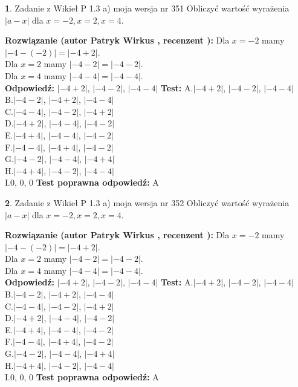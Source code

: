 \documentclass[12pt, a4paper]{article}
\theoremstyle{definition} %
\newtheorem{zad}{}
\newcommand{\zadStart}[1]{\begin{zad}#1\newline}
\newcommand{\zadStop}{\end{zad}}
\newcommand{\rozwStart}[2]{\noindent \textbf{Rozwiązanie (autor #1 , recenzent #2): }\newline}
\newcommand{\rozwStop}{\newline}
\newcommand{\odpStart}{\noindent \textbf{Odpowiedź:}\newline}
\newcommand{\odpStop}{\newline}
\newcommand{\testStart}{\noindent \textbf{Test:}\newline}
\newcommand{\testStop}{\newline}
\newcommand{\kluczStart}{\noindent \textbf{Test poprawna odpowiedź:}\newline}
\newcommand{\kluczStop}{\newline}
\begin{document}
\zadStart{Zadanie z Wikieł P 1.3 a) moja wersja nr 351}
Obliczyć wartość wyrażenia $|a - x|$ dla $x=-2,x=2,x=4$.
\zadStop
\rozwStart{Patryk Wirkus}{}
Dla $x = -2$ mamy $|-4 - (-2)| = |-4 + 2|$.\\
Dla $x = 2$ mamy $|-4 - 2| = |-4 - 2|$.\\
Dla $x = 4$ mamy $|-4 - 4| = |-4 - 4|$.\\
\rozwStop
\odpStart
$|-4 + 2|$, $|-4 - 2|$, $|-4 - 4|$
\odpStop
\testStart
A.$|-4 + 2|$, $|-4 - 2|$, $|-4 - 4|$\\
B.$|-4 - 2|$, $|-4 + 2|$, $|-4 - 4|$\\
C.$|-4 - 4|$, $|-4 - 2|$, $|-4 + 2|$\\
D.$|-4 + 2|$, $|-4 - 4|$, $|-4 - 2|$\\
E.$|-4 + 4|$, $|-4 - 4|$, $|-4 - 2|$\\
F.$|-4 - 4|$, $|-4 + 4|$, $|-4 - 2|$\\
G.$|-4 - 2|$, $|-4 - 4|$, $|-4 + 4|$\\
H.$|-4 + 4|$, $|-4 - 2|$, $|-4 - 4|$\\
I.$0$, $0$, $0$
\testStop
\kluczStart
A
\kluczStop



\zadStart{Zadanie z Wikieł P 1.3 a) moja wersja nr 352}
Obliczyć wartość wyrażenia $|a - x|$ dla $x=-2,x=2,x=4$.
\zadStop
\rozwStart{Patryk Wirkus}{}
Dla $x = -2$ mamy $|-4 - (-2)| = |-4 + 2|$.\\
Dla $x = 2$ mamy $|-4 - 2| = |-4 - 2|$.\\
Dla $x = 4$ mamy $|-4 - 4| = |-4 - 4|$.\\
\rozwStop
\odpStart
$|-4 + 2|$, $|-4 - 2|$, $|-4 - 4|$
\odpStop
\testStart
A.$|-4 + 2|$, $|-4 - 2|$, $|-4 - 4|$\\
B.$|-4 - 2|$, $|-4 + 2|$, $|-4 - 4|$\\
C.$|-4 - 4|$, $|-4 - 2|$, $|-4 + 2|$\\
D.$|-4 + 2|$, $|-4 - 4|$, $|-4 - 2|$\\
E.$|-4 + 4|$, $|-4 - 4|$, $|-4 - 2|$\\
F.$|-4 - 4|$, $|-4 + 4|$, $|-4 - 2|$\\
G.$|-4 - 2|$, $|-4 - 4|$, $|-4 + 4|$\\
H.$|-4 + 4|$, $|-4 - 2|$, $|-4 - 4|$\\
I.$0$, $0$, $0$
\testStop
\kluczStart
A
\kluczStop
\end{document}
